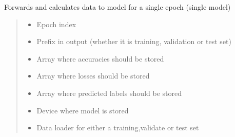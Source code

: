 \documentclass[letterpaper,10pt,english]{sphinxmanual}
\begin{document}
\begin{fulllineitems}
\begin{fulllineitems}
\label{\detokenize{net:net.UVANEMO.__single_evaluate_forward}}
\pysigstartsignatures
{}
\pysigstopsignatures
\sphinxAtStartPar
Forwards and calculates data to model for a single epoch (single model)
\begin{quote}\begin{description}
\begin{itemize}
\item {} 
\sphinxAtStartPar
{} \textendash{} Epoch index

\item {} 
\sphinxAtStartPar
{} \textendash{} Prefix in output (whether it is training, validation or test set)

\item {} 
\sphinxAtStartPar
{} \textendash{} Array where accuracies should be stored

\item {} 
\sphinxAtStartPar
{} \textendash{} Array where losses should be stored

\item {} 
\sphinxAtStartPar
{} \textendash{} Array where predicted labels should be stored

\item {} 
\sphinxAtStartPar
{} \textendash{} Device where model is stored

\item {} 
\sphinxAtStartPar
{} \textendash{} Data loader for either a training,validate or test set


\end{itemize}
\end{description}
\end{quote}
\end{fulllineitems}
\end{fulllineitems}
\end{document}
